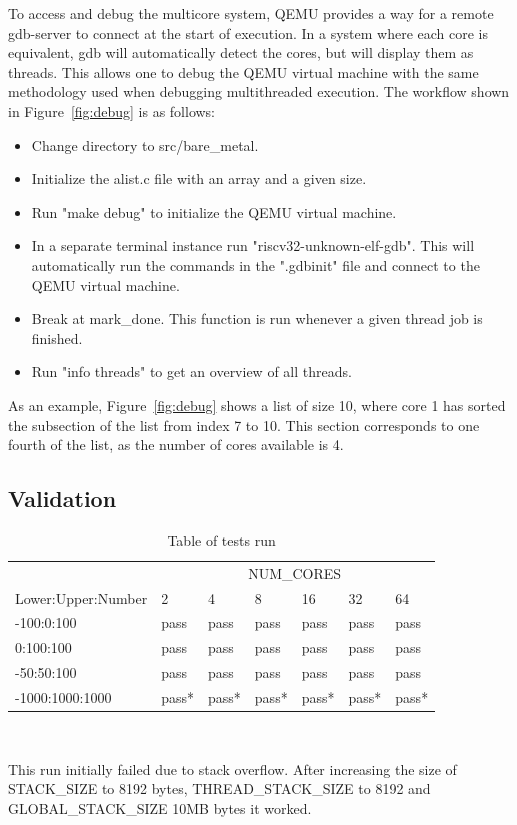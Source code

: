 To access and debug the multicore system, QEMU provides a way for a remote
gdb-server to connect at the start of execution.\cite{QEMU} In a system where
each core is equivalent, gdb will automatically detect the cores, but will
display them as threads. This allows one to debug the QEMU virtual machine with
the same methodology used when debugging multithreaded execution. The workflow
shown in Figure~\ref{fig:debug} is as follows:
\begin{itemize}
\item Change directory to src/bare_metal.
\item Initialize the alist.c file with an array and a given size.
\item Run "make debug" to initialize the QEMU virtual machine.
\item In a separate terminal instance run "riscv32-unknown-elf-gdb". This will
  automatically run the commands in the ".gdbinit" file and connect to the QEMU
  virtual machine.
\item Break at mark_done. This function is run whenever a given thread job is
  finished.
\item Run "info threads" to get an overview of all threads.
\end{itemize}
As an example, Figure~\ref{fig:debug} shows a list of size 10, where core 1 has
sorted the subsection of the list from index 7 to 10. This section corresponds
to one fourth of the list, as the number of cores available is 4.

\subsection{Validation}\label{sec:validate}
\begin{table}
  \caption{Table of tests run}\label{tab:tests}
  \begin{center}
    \begin{tabular}[c]{l|l|l|l|l|l|l}
      & \multicolumn{6}{c}{NUM\_CORES}\\
      \cline{2-7}
      Lower:Upper:Number & 2 & 4 & 8 & 16 & 32 & 64\\
      \hline
      -100:0:100 & pass & pass & pass & pass & pass & pass \\
      \hline
      0:100:100 & pass & pass & pass & pass & pass & pass\\
      \hline
      -50:50:100 & pass & pass & pass & pass & pass & pass \\
      \hline
      -1000:1000:1000 & pass* & pass* & pass* & pass* & pass* & pass*
    \end{tabular} \\
    \vspace{1em}
    \raggedright{\footnotesize *This run initially failed due to stack overflow. After
    increasing the size of STACK\_SIZE to 8192 bytes, THREAD\_STACK\_SIZE to
  8192 and GLOBAL\_STACK\_SIZE 10MB bytes it worked.} \\
  \end{center}
\end{table}

